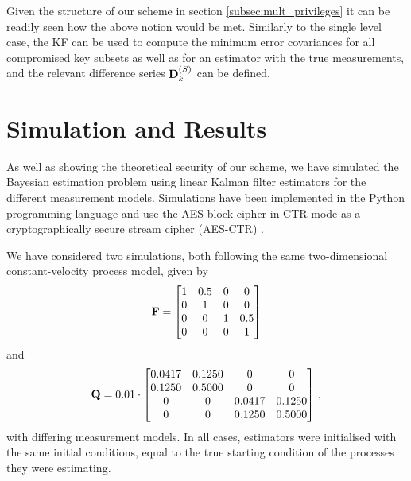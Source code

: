 \documentclass[letterpaper, 10 pt, conference]{IEEEtran}
\theoremstyle{definition}
\begin{document}
Given the structure of our scheme in section \ref{subsec:mult_privileges} it can be readily seen how the above notion would be met. Similarly to the single level case, the KF can be used to compute the minimum error covariances for all compromised key subsets as well as for an estimator with the true measurements, and the relevant difference series ${{\mathbf{D}}}^{(S)}_k$ can be defined. 

% 
%                                 
%                                 
%                                 
% 

\section{Simulation and Results}\label{sec:simulation}
As well as showing the theoretical security of our scheme, we have simulated the Bayesian estimation problem using linear Kalman filter estimators for the different measurement models. Simulations have been implemented in the Python programming language and use the AES block cipher in CTR mode as a cryptographically secure stream cipher (AES-CTR) \cite{gueronIntelAdvancedEncryption2010}.

We have considered two simulations, both following the same two-dimensional constant-velocity process model, given by
\begin{equation*}
   {\ensuremath{{\mathbf{F}}}}=
   \begin{bmatrix}
      1 & 0.5 & 0 & 0\\
      0 & 1 & 0 & 0\\
      0 & 0 & 1 & 0.5\\
      0 & 0 & 0 & 1
   \end{bmatrix}
\end{equation*}
and
\begin{equation*}
   {\ensuremath{{\mathbf{Q}}}}=0.01\cdot
   \begin{bmatrix}
      0.0417 & 0.1250 & 0 & 0\\
      0.1250 & 0.5000 & 0 & 0\\
      0 & 0 & 0.0417 & 0.1250\\
      0 & 0 & 0.1250 & 0.5000
   \end{bmatrix}\,,
\end{equation*}
with differing measurement models. In all cases, estimators were initialised with the same initial conditions, equal to the true starting condition of the processes they were estimating.
\end{document}
